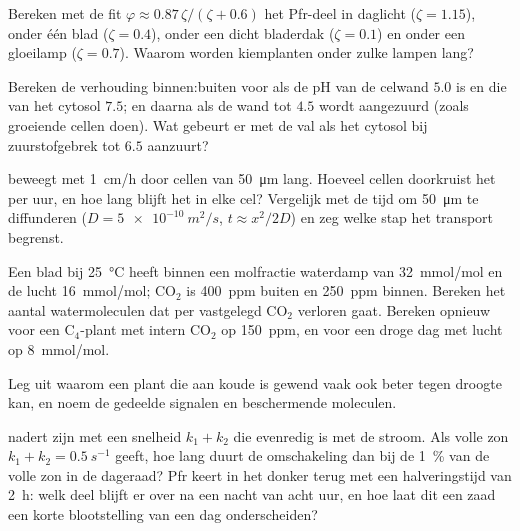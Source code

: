 \begin{exercise}[$\star\star$]\label{exo:b3:plant-molecular-physiology:5}
Bereken met de fit $\varphi \approx 0.87\,\zeta/(\zeta + 0.6)$ het
Pfr-deel in daglicht ($\zeta = 1.15$), onder één blad ($\zeta =
0.4$), onder een dicht bladerdak ($\zeta = 0.1$) en onder een gloeilamp
($\zeta = 0.7$). Waarom worden kiemplanten onder zulke lampen lang?
\end{exercise}

\begin{exercise}[$\star\star$]\label{exo:b3:plant-molecular-physiology:6}
Bereken de verhouding binnen:buiten voor  als de pH van de
celwand $5.0$ is en die van het cytosol $7.5$; en daarna als de wand
tot $4.5$ wordt aangezuurd (zoals groeiende cellen doen). Wat gebeurt
er met de val als het cytosol bij zuurstofgebrek tot $6.5$ aanzuurt?
\end{exercise}

\begin{exercise}[$\star\star$]\label{exo:b3:plant-molecular-physiology:7}
 beweegt met \qty{1}{cm/h} door cellen van \qty{50}{\micro m}
lang. Hoeveel cellen doorkruist het per uur, en hoe lang blijft het in
elke cel? Vergelijk met de tijd om \qty{50}{\micro m} te diffunderen ($D =
\qty{5e-10}{m^2/s}$, $t \approx x^{2}/2D$) en zeg welke stap het
transport begrenst.
\end{exercise}

\begin{exercise}[$\star\star$]\label{exo:b3:plant-molecular-physiology:8}
Een blad bij \qty{25}{\celsius} heeft binnen een molfractie waterdamp
van \qty{32}{mmol/mol} en de lucht \qty{16}{mmol/mol}; CO$_{2}$ is
\qty{400}{ppm} buiten en \qty{250}{ppm} binnen. Bereken het aantal
watermoleculen dat per vastgelegd CO$_{2}$ verloren gaat. Bereken
opnieuw voor een C$_{4}$-plant met intern CO$_{2}$ op \qty{150}{ppm},
en voor een droge dag met lucht op \qty{8}{mmol/mol}.
\end{exercise}

\begin{exercise}[$\star\star$]\label{exo:b3:plant-molecular-physiology:9}
Leg uit waarom een plant die aan koude is gewend vaak ook beter tegen
droogte kan, en noem de gedeelde signalen en beschermende moleculen.
\end{exercise}

\begin{exercise}[$\star\star\star$]\label{exo:b3:plant-molecular-physiology:10}
 nadert zijn  met een snelheid $k_{1} + k_{2}$
die evenredig is met de stroom. Als volle zon $k_{1} + k_{2} =
\qty{0.5}{s^{-1}}$ geeft, hoe lang duurt de omschakeling dan bij de
\qty{1}{\%} van de volle zon in de dageraad? Pfr keert in het donker
terug met een halveringstijd van \qty{2}{h}: welk deel blijft er over
na een nacht van acht uur, en hoe laat dit een zaad een korte
blootstelling van een dag onderscheiden?
\end{exercise}


